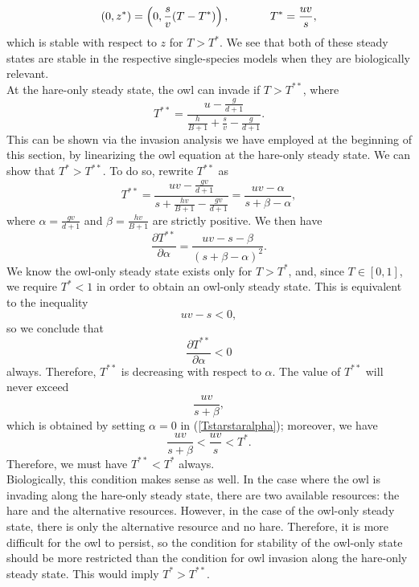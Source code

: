 \documentclass[12pt]{UOthesis}
\theoremstyle{remarkstyle}
\begin{document}
\begin{equation}
	(0,z^*)=\left(0,\frac{s}{v}(T-T^*)\right),\hspace{0.5in} T^*=\frac{uv}{s},
	\label{HLOy=0OwlOnlyState}
\end{equation}
which is stable with respect to $z$ for $T>T^*$. We see that both of these steady states are stable in the respective single-species models when they are biologically relevant.\\

At the hare-only steady state, the owl can invade if $T>T^{**}$, where
\begin{equation}
	T^{**}=\frac{u-\frac{g}{d+1}}{\frac{h}{B+1}+\frac{s}{v}-\frac{g}{d+1}}.
	\label{Tstarstar}
\end{equation}
This can be shown via the invasion analysis we have employed at the beginning of this section, by linearizing the owl equation at the hare-only steady state. We can show that $T^*>T^{**}$. To do so, rewrite $T^{**}$ as
\begin{equation}
	T^{**}=\frac{uv-\frac{gv}{d+1}}{s+\frac{hv}{B+1}-\frac{gv}{d+1}}=\frac{uv-\alpha}{s+\beta-\alpha},
	\label{Tstarstaralpha}
\end{equation}
where $\alpha=\frac{gv}{d+1}$ and $\beta=\frac{hv}{B+1}$ are strictly positive. We then have
$$\frac{\partial T^{**}}{\partial \alpha}=\frac{uv-s-\beta}{(s+\beta-\alpha)^2}.$$
We know the owl-only steady state exists only for $T>T^*$, and, since $T\in [0,1]$, we require $T^*<1$ in order to obtain an owl-only steady state. This is equivalent to the inequality
$$uv-s<0,$$
so we conclude that
$$\frac{\partial T^{**}}{\partial \alpha}<0$$
always. Therefore, $T^{**}$ is decreasing with respect to $\alpha$. The value of $T^{**}$ will never exceed
$$\frac{uv}{s+\beta},$$
which is obtained by setting $\alpha=0$ in (\ref{Tstarstaralpha}); moreover, we have
$$\frac{uv}{s+\beta}<\frac{uv}{s}<T^*.$$
Therefore, we must have $T^{**}<T^*$ always.\\

Biologically, this condition makes sense as well. In the case where the owl is invading along the hare-only steady state, there are two available resources: the hare and the alternative resources. However, in the case of the owl-only steady state, there is only the alternative resource and no hare. Therefore, it is more difficult for the owl to persist, so the condition for stability of the owl-only state should be more restricted than the condition for owl invasion along the hare-only steady state. This would imply $T^*>T^{**}$.\\
\end{document}
